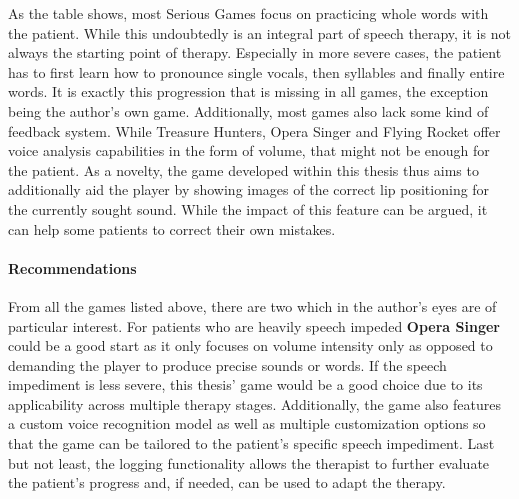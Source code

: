 \documentclass[draft,final]{vutinfth} %
\begin{document}
As the table shows, most Serious Games focus on practicing whole words with the patient. While this undoubtedly is an integral part of speech therapy, it is not always the starting point of therapy. Especially in more severe cases, the patient has to first learn how to pronounce single vocals, then syllables and finally entire words. It is exactly this progression that is missing in all games, the exception being the author's own game.
Additionally, most games also lack some kind of feedback system. While Treasure Hunters, Opera Singer and Flying Rocket offer voice analysis capabilities in the form of volume, that might not be enough for the patient. As a novelty, the game developed within this thesis thus aims to additionally aid the player by showing images of the correct lip positioning for the currently sought sound. While the impact of this feature can be argued, it can help some patients to correct their own mistakes.


\paragraph{Recommendations} 
From all the games listed above, there are two which in the author's eyes are of particular interest. For patients who are heavily speech impeded \textbf{Opera Singer} could be a good start as it only focuses on volume intensity only as opposed to demanding the player to produce precise sounds or words. If the speech impediment is less severe, this thesis' game would be a good choice due to its applicability across multiple therapy stages. Additionally, the game also features a custom voice recognition model as well as multiple customization options so that the game can be tailored to the patient's specific speech impediment. Last but not least, the logging functionality allows the therapist to further evaluate the patient's progress and, if needed, can be used to adapt the therapy.
\end{document}
